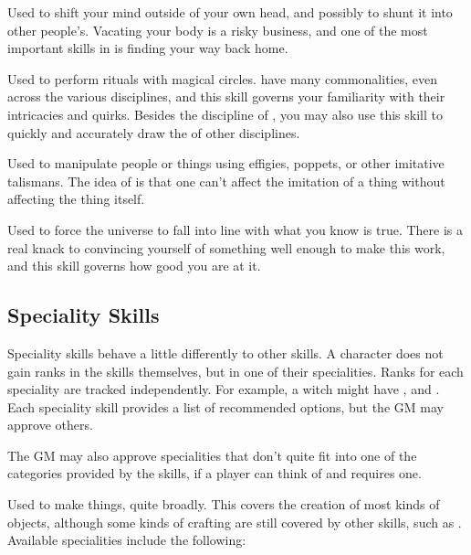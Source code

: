 Used to shift your mind outside of your own head, and possibly to shunt it into other people's.
Vacating your body is a risky business, and one of the most important skills in  is finding your way back home.


Used to perform rituals with magical circles.
 have many commonalities, even across the various disciplines, and this skill governs your familiarity with their intricacies and quirks.
Besides the discipline of , you may also use this skill to quickly and accurately draw the  of other disciplines.


Used to manipulate people or things using effigies, poppets, or other imitative talismans.
The idea of  is that one can't affect the imitation of a thing without affecting the thing itself.


Used to force the universe to fall into line with what you know is true.
There is a real knack to convincing yourself of something well enough to make this work, and this skill governs how good you are at it.

\subsection{Speciality Skills}

Speciality skills behave a little differently to other skills.
A character does not gain ranks in the skills themselves, but in one of their specialities.
Ranks for each speciality are tracked independently.
For example, a witch might have ,  and .
Each speciality skill provides a list of recommended options, but the GM may approve others.

The GM may also approve specialities that don't quite fit into one of the categories provided by the skills, if a player can think of and requires one.


Used to make things, quite broadly.
This covers the creation of most kinds of objects, although some kinds of crafting are still covered by other skills, such as .
Available specialities include the following:


